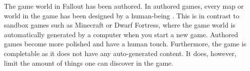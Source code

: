 The game world in Fallout has been authored. In authored games, every map or world in the game has been designed by a human-being \autocite[87]{digitale}. This is in contrast to sandbox games such as Minecraft or Dwarf Fortress, where the game world is automatically generated by a computer when you start a new game. Authored games become more polished and have a human touch. Furthermore, the game is completable as it does not have any auto-generated content. It does, however, limit the amount of things one can discover in the game.
